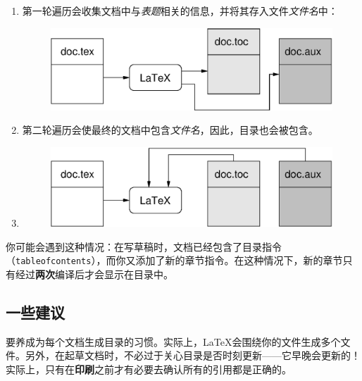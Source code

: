 \begin{enumerate}
  \item 第一轮遍历会收集文档中与\emph{表题}相关的信息，并将其存入文件\textsl{\<文件名\>}中：
  
  \begin{figure}[h]
    \begin{center}
      \includegraphics{img/toc1.eps}
    \end{center}
  \end{figure}

  \item 第二轮遍历会使最终的文档中包含\textsl{\<文件名\>}，因此，目录也会被包含。
  \item 
  \begin{figure}[h]
    \begin{center}
      \includegraphics{img/toc2.eps}
    \end{center}
  \end{figure}

\end{enumerate}

你可能会遇到这种情况：在写草稿时，文档已经包含了目录指令（\verb|tableofcontents|），而你又添加了新的章节指令。在这种情况下，新的章节只有经过\textbf{两次}编译后才会显示在目录中。

\subsection{一些建议}

要养成为每个文档生成目录的习惯。实际上，\LaTeX 会围绕你的文件生成多个文件。另外，在起草文档时，不必过于关心目录是否时刻更新——它早晚会更新的！实际上，只有在\textbf{印刷}之前才有必要去确认所有的引用都是正确的。

